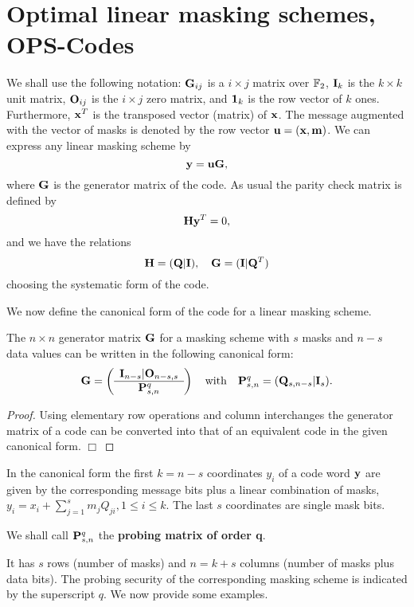 \documentclass[11pt]{llncs}
\newcommand{\BE}{\begin{equation}}      \newcommand{\EE}{\end{equation}}
\newcommand{\BDEF}{\begin{definition}}  \newcommand{\EDEF}{\end{definition}}
\newcommand{\QED}{\hfill $\Box$}
\begin{document}
\section{Optimal linear masking schemes, OPS-Codes}\label{Sec:OPS}
We shall use the following notation:
$\mathbf{G}_{ij}$ is a $i\times j$ matrix over $\mathbb{F}_2$,
$\mathbf{I}_k$ is the $k\times k$ unit matrix,
$\mathbf{O}_{ij}$ is the $i\times j$ zero matrix,
and $\mathbf{1}_k$ is the row vector of $k$ ones.
Furthermore, $\mathbf{x}^T$ is the transposed vector (matrix) of $\mathbf{x}$.
The message augmented with the vector of masks is denoted by the row vector
$\mathbf{u} = (\mathbf{x} , \mathbf{m})$.
We can express any linear masking scheme by
\[
    \mathbf{y} = \mathbf{u} \mathbf{G},
\]
where $\mathbf{G}$ is the generator matrix of the code.
As usual the parity check matrix is defined by
\[
    \mathbf{H} \mathbf{y}^T = 0,
\]
and we have the relations
\BE
\V H = (\V Q | \V I), \quad \V G = (\V I | \V Q^T)
\label{Eq:GenParRelation}
\EE
choosing the systematic form of the code.

We now define the canonical form of the code for a linear masking scheme.
\begin{proposition}
The $n\times n$ generator matrix $\mathbf{G}$
for a masking scheme with $s$ masks and $n-s$ data values
can be written in the following canonical form:
\BE\label{Eq:ProbingMatrix}
 \V G =
 \left(\begin{array}{c}
  \V I_{n-s} | \V O_{n-s,s} \\
  \hline
  \V P^q_{s,n}
 \end{array}\right)
              \quad
              \textrm{with}
              \quad
 \V P^q_{s,n} = (\V Q_{s,n-s} | \V I_{s}).
\EE
\end{proposition}
\begin{proof}
Using elementary row operations and column interchanges the
generator matrix of a code can be converted into that of
an equivalent code in the given canonical form. \QED
\end{proof}
In the canonical form the first $k = n-s$
coordinates $y_i$ of a code word $\mathbf{y}$ are
given by the corresponding message bits plus a linear combination of masks,
$y_i = x_i + \sum_{j=1}^{s} m_j Q_{ji}, 1 \le i \le k$.
The last $s$ coordinates are single mask bits.
\BDEF
We shall call $\mathbf{P}^q_{s,n}$ the \textbf{probing matrix of order q}.
\EDEF
It has $s$ rows (number of masks) and $n=k+s$ columns
(number of masks plus data bits). The probing security of the
corresponding masking scheme is indicated by the superscript $q$.
We now provide some examples.
\end{document}
